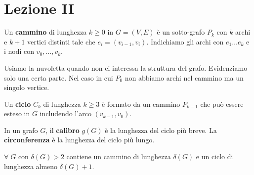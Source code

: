 \documentclass[12pt]{report}
\begin{document}
\chapter{Lezione II}

\noindent
Un \textbf{cammino} di lunghezza $k \geq 0$ in $G = (V,E)$ è un sotto-grafo $P_k$ con $k$ archi e $k+1$ vertici distinti tale che $e_i = (v_{i-1},v_i)$. Indichiamo gli archi con $e_1 \dots e_k$ e i nodi con $v_0,\dots,v_k$.


\noindent 
Usiamo la nuvoletta quando non ci interessa la struttura del grafo. Evidenziamo solo una certa parte.
Nel caso in cui $P_0$ non abbiamo archi nel cammino ma un singolo vertice.

Un \textbf{ciclo} $C_k$ di lunghezza $k \geq 3$ è formato da un cammino $P_{k-1}$ che può essere esteso in $G$ includendo l'arco $(v_{k-1},v_0)$.



\noindent 
In un grafo $G$, il \textbf{calibro} $g(G)$ è la lunghezza del ciclo più breve. La \textbf{circonferenza} è la lunghezza del ciclo più lungo. 

\begin{fatto}
    $\forall \; G$ con $\delta(G) > 2$ contiene un cammino di lunghezza $\delta(G)$ e un ciclo di lunghezza almeno $\delta(G) + 1$.
\end{fatto}
\end{document}
